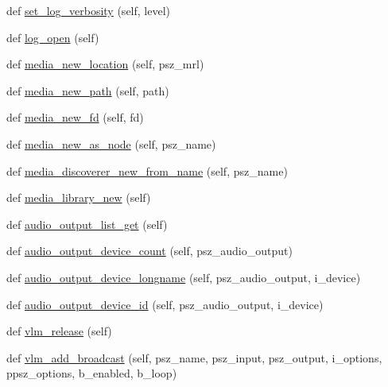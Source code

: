 \begin{DoxyCompactItemize}
def \hyperlink{classsrc_1_1lib_1_1vlc_1_1Instance_a7336876914fc6252b64032b38baa519b}{set\+\_\+log\+\_\+verbosity} (self, level)
\item 
def \hyperlink{classsrc_1_1lib_1_1vlc_1_1Instance_aac3f845fafe028a1ea5674bea8e35062}{log\+\_\+open} (self)
\item 
def \hyperlink{classsrc_1_1lib_1_1vlc_1_1Instance_a5d53d055dee435d03fccd87cc7ceac54}{media\+\_\+new\+\_\+location} (self, psz\+\_\+mrl)
\item 
def \hyperlink{classsrc_1_1lib_1_1vlc_1_1Instance_ae99efbc23fa602f5f9e942b39167cd7d}{media\+\_\+new\+\_\+path} (self, path)
\item 
def \hyperlink{classsrc_1_1lib_1_1vlc_1_1Instance_a95ba5c11f75a81ce55a87ab2ecc8540d}{media\+\_\+new\+\_\+fd} (self, fd)
\item 
def \hyperlink{classsrc_1_1lib_1_1vlc_1_1Instance_acbd9f11bee08499349ccf2817d6431fb}{media\+\_\+new\+\_\+as\+\_\+node} (self, psz\+\_\+name)
\item 
def \hyperlink{classsrc_1_1lib_1_1vlc_1_1Instance_ab7909c382439a6feab4c8c1017cbc251}{media\+\_\+discoverer\+\_\+new\+\_\+from\+\_\+name} (self, psz\+\_\+name)
\item 
def \hyperlink{classsrc_1_1lib_1_1vlc_1_1Instance_a7ef0d8802a23a731f9c26b590630c6cf}{media\+\_\+library\+\_\+new} (self)
\item 
def \hyperlink{classsrc_1_1lib_1_1vlc_1_1Instance_ae5fb9caf5809300f76a354d9bc8944ad}{audio\+\_\+output\+\_\+list\+\_\+get} (self)
\item 
def \hyperlink{classsrc_1_1lib_1_1vlc_1_1Instance_a714f484b53c481fee361d0ceb5bc8696}{audio\+\_\+output\+\_\+device\+\_\+count} (self, psz\+\_\+audio\+\_\+output)
\item 
def \hyperlink{classsrc_1_1lib_1_1vlc_1_1Instance_a4299934b3829897de26c114459498dc7}{audio\+\_\+output\+\_\+device\+\_\+longname} (self, psz\+\_\+audio\+\_\+output, i\+\_\+device)
\item 
def \hyperlink{classsrc_1_1lib_1_1vlc_1_1Instance_a635b7449ca9172b69051c41c17c6a785}{audio\+\_\+output\+\_\+device\+\_\+id} (self, psz\+\_\+audio\+\_\+output, i\+\_\+device)
\item 
def \hyperlink{classsrc_1_1lib_1_1vlc_1_1Instance_aed1e30f9deffb29435c61bf4503b0ad6}{vlm\+\_\+release} (self)
\item 
def \hyperlink{classsrc_1_1lib_1_1vlc_1_1Instance_a2683025483a5746b5716f02d93f000f3}{vlm\+\_\+add\+\_\+broadcast} (self, psz\+\_\+name, psz\+\_\+input, psz\+\_\+output, i\+\_\+options, ppsz\+\_\+options, b\+\_\+enabled, b\+\_\+loop)

\end{DoxyCompactItemize}
